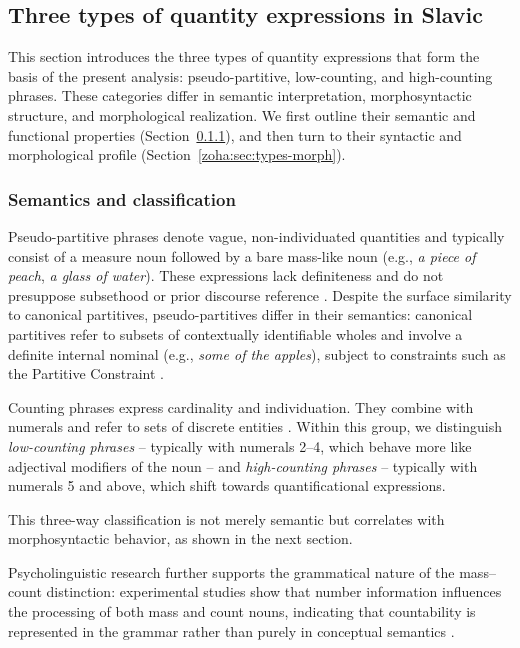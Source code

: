 \documentclass[output=paper,colorlinks,citecolor=brown
]{langscibook}
\begin{document}
\subsection{Three types of quantity expressions in Slavic} \label{zoha:sec:types}

This section introduces the three types of quantity expressions that form the basis of the present analysis: pseudo-partitive, low-counting, and high-counting phrases. These categories differ in semantic interpretation, morphosyntactic structure, and morphological realization. We first outline their semantic and functional properties (Section~\ref{zoha:sec:types-semantics}), and then turn to their syntactic and morphological profile (Section~\ref{zoha:sec:types-morph}).

\subsubsection{Semantics and classification} \label{zoha:sec:types-semantics}

Pseudo-partitive phrases denote vague, non-individuated quantities and typically consist of a measure noun followed by a bare mass-like noun (e.g., \textit{a piece of peach}, \textit{a glass of water}). These expressions lack definiteness and do not presuppose subsethood or prior discourse reference \citep{Selkirk1977,FalcoZamparelli2019}. Despite the surface similarity to canonical partitives, pseudo-partitives differ in their semantics: canonical partitives refer to subsets of contextually identifiable wholes and involve a definite internal nominal (e.g., \textit{some of the apples}), subject to constraints such as the Partitive Constraint \citep{jackendoff1977}.

Counting phrases express cardinality and individuation. They combine with numerals and refer to sets of discrete entities \citep{Bultnick2005}. Within this group, we distinguish \textit{low-counting phrases} -- typically with numerals 2–4, which behave more like adjectival modifiers of the noun -- and \textit{high-counting phrases} -- typically with numerals 5 and above, which shift towards quantificational expressions.

This three-way classification is not merely semantic but correlates with morphosyntactic behavior, as shown in the next section. 

Psycholinguistic research further supports the grammatical nature of the mass–count distinction: experimental studies show that number information influences the processing of both mass and count nouns, indicating that countability is represented in the grammar rather than purely in conceptual semantics \citep{fieder2017counting}. 
\end{document}
